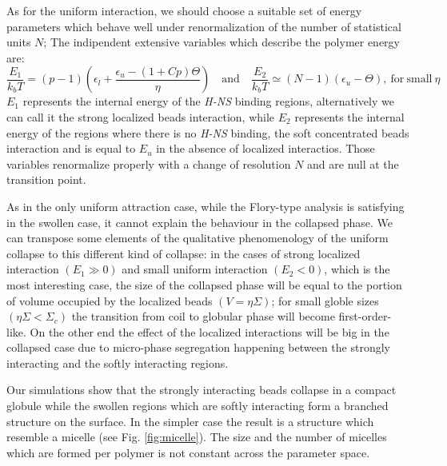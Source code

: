 \documentclass[12pt,a4paper,notitlepage]{article}
\newcommand{\hns}{\emph{H-NS}\xspace}
\begin{document}
As for the uniform interaction, we should choose a suitable set of
energy parameters which behave well under renormalization of the
number of statistical units $N$; The indipendent
extensive variables which describe the polymer energy are:
\begin{equation}
\label{eq:loccollapse}
\frac{E_1}{k_bT} = (p - 1)\left(\epsilon_l + \frac{\epsilon_u - (1 +
    C p)\Theta}{\eta}\right)
\quad \mathrm{and} \quad
\frac{E_2}{k_bT} \simeq (N - 1)(\epsilon_u - \Theta), \mathrm{\ for\ small\ }
\eta 
\end{equation}
$E_1$ represents the internal energy of the \hns
binding regions, alternatively we can call it the strong localized
beads interaction, while $E_2$ represents the internal energy of the
regions where there is no \hns binding, the soft concentrated beads
interaction and is equal to $E_u$ in the absence of localized
interactios. Those variables renormalize properly with a change of
resolution $N$ and are null at the transition point.

As in the only uniform attraction case, while the Flory-type analysis
is satisfying in the swollen case, it cannot explain the behaviour in
the collapsed phase. We can transpose some elements of the qualitative
phenomenology of the uniform collapse to this different kind of
collapse: in the cases of strong localized interaction
$(E_1 \gg 0)$ and small uniform interaction $(E_2 < 0)$, which is the
most interesting case, the size of the collapsed phase will be equal
to the portion of volume occupied by the localized beads $(V = \eta
\Sigma)$; for small globle sizes $(\eta \Sigma < \Sigma_c)$ the
transition from coil to globular phase will become
first-order-like. On the other end the effect of the localized
interactions will be big in the collapsed case due to micro-phase
segregation happening between the strongly interacting and the softly
interacting regions.

Our simulations show that the strongly interacting beads collapse in a
compact globule while the swollen regions which are softly interacting
form a branched structure on the surface. In the simpler case the
result is a structure which resemble a micelle
(see Fig. \ref{fig:micelle}). The size and the number of micelles
which are formed per polymer is not constant across the parameter space.
\end{document}
